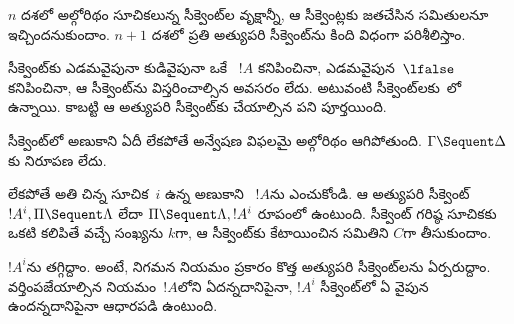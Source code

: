 \documentclass[../../../include/open-logic-section]{subfiles}
\begin{document}
$n$ దశలో అల్గోరిథం సూచికలున్న సీక్వెంట్‌ల వృక్షాన్నీ, ఆ సీక్వెంట్లకు జతచేసిన  సమితులనూ ఇచ్చిందనుకుందాం. $n+1$ దశలో ప్రతి అత్యుపరి సీక్వెంట్‌ను కింది విధంగా పరిశీలిస్తాం.

సీక్వెంట్‌కు ఎడమవైపునా కుడివైపునా ఒకే ~$!A$ కనిపించినా, ఎడమవైపున~$\lfalse$ కనిపించినా, ఆ సీక్వెంట్‌ను విస్తరించాల్సిన అవసరం లేదు. అటువంటి సీక్వెంట్‌లకు~లో  ఉన్నాయి. కాబట్టి ఆ అత్యుపరి సీక్వెంట్‌కు చేయాల్సిన పని పూర్తయింది.

సీక్వెంట్‌లో అణుకాని  ఏదీ లేకపోతే అన్వేషణ విఫలమై అల్గోరిథం ఆగిపోతుంది. $\Gamma \Sequent \Delta$కు నిరూపణ లేదు.

లేకపోతే అతి చిన్న సూచిక~$i$ ఉన్న అణుకాని ~$!A$ను ఎంచుకోండి. ఆ అత్యుపరి సీక్వెంట్ $!A^i, \Pi
\Sequent \Lambda$ లేదా $\Pi \Sequent \Lambda, !A^i$ రూపంలో ఉంటుంది. సీక్వెంట్ గరిష్ఠ సూచికకు ఒకటి కలిపితే వచ్చే సంఖ్యను $k$గా, ఆ సీక్వెంట్‌కు కేటాయించిన  సమితిని $C$గా తీసుకుందాం.

$!A^i$ను తగ్గిద్దాం. అంటే, నిగమన నియమం ప్రకారం కొత్త అత్యుపరి సీక్వెంట్‌లను ఏర్పరుద్దాం. వర్తింపజేయాల్సిన నియమం~$!A$లోని  ఏదన్నదానిపైనా, $!A^i$ సీక్వెంట్‌లో ఏ వైపున ఉందన్నదానిపైనా ఆధారపడి ఉంటుంది.
\end{document}
